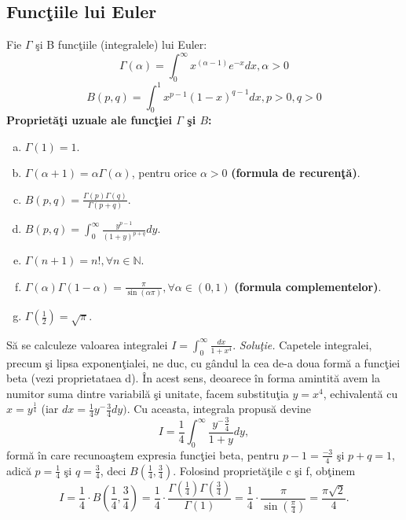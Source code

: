 \documentclass{article}
\begin{document}
\subsection{Func\c tiile lui Euler}
Fie $\Gamma$ \c si B func\c tiile (integralele) lui Euler:
$$ \Gamma(\alpha) = \int_{0}^{\infty} x^{(\alpha - 1)}e^{-x}dx, \alpha > 0 $$
$$ B(p, q) = \int_{0}^{1} x^{p - 1}{(1 - x)}^{q - 1}dx, p > 0, q > 0 $$
\vspace{0.4 cm}
\newline
{\bf Propriet\u a\c ti uzuale ale func\c tiei $\Gamma$ \c si $B$:}
\begin{enumerate}[a.]
\item $ \Gamma(1) = 1. $
\item $ \Gamma(\alpha + 1) = \alpha\Gamma(\alpha)$, pentru orice $\alpha > 0$ {\bf (formula de recuren\c t\u a)}.
\item $ B(p, q) = \frac{\Gamma(p)\Gamma(q)}{\Gamma(p + q)}. $
\item $ B(p, q) =\int_{0}^{\infty} \frac{y^{p - 1}}{(1 + y)^{p + q}} dy. $
\item $\Gamma(n+1) = n!,  \forall n \in \mathbb{N}$.
\item $\Gamma(\alpha)\Gamma(1 - \alpha) = \frac{\pi}{\sin (\alpha \pi)}, \forall \alpha \in (0, 1)$ {\bf (formula complementelor)}.
\item $\Gamma(\frac 12) = \sqrt{\pi}$.
\end{enumerate} \par
\vspace{0.3 cm}
S\u a se calculeze valoarea integralei $I = \int_{0}^{\infty}\frac{dx}{1 + x^4}.$
\newline
\emph {Solu\c tie.} \cite{text2} Capetele integralei, precum \c si lipsa exponen\c tialei, ne duc, cu g\^ andul la cea de-a doua form\u a a func\c tiei beta (vezi proprietataea d). \^ In acest sens, deoarece \^ in forma amintit\u a avem la numitor suma dintre variabil\u a \c si unitate, facem substitu\c tia $y = x^4$, echivalent\u a cu $x = y^{\frac14}$ (iar $dx = \frac14 y^-{\frac{3}4}dy)$. Cu aceasta, integrala propus\u a devine
$$ I = \frac14 \int_{0}^{\infty} \frac{y^-{\frac{3}4}}{1 + y} dy, $$
form\u a \^ in care recunoa\c stem expresia func\c tiei beta, pentru $p - 1 = \frac{-3}4$ \c si $p + q = 1$, adic\u a $p = \frac14$ \c si $q = \frac34$, deci $B(\frac14, \frac34)$. Folosind propriet\u a\c tile c \c si f, ob\c tinem
$$ I = \frac14 \cdot B(\frac14, \frac34) = \frac14 \cdot \frac{\Gamma(\frac14)\Gamma(\frac34)}{\Gamma(1)} = \frac14 \cdot  \frac{\pi}{\sin(\frac{\pi}4)} = \frac{\pi\sqrt{2}}4.$$ 
\end{document}

